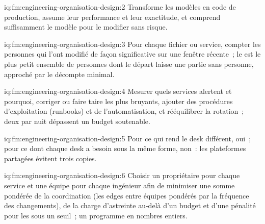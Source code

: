 \begin{solution}{iq:fm:engineering-organisation-design:2}
Transforme les modèles en code de production, assume leur performance et leur exactitude, et comprend suffisamment le modèle pour le modifier sans risque.
\end{solution}

\begin{solution}{iq:fm:engineering-organisation-design:3}
Pour chaque fichier ou service, compter les personnes qui l'ont modifié de façon significative sur une fenêtre récente~; le  est le plus petit ensemble de personnes dont
le départ laisse une partie sans personne, approché par le décompte minimal.
\end{solution}

\begin{solution}{iq:fm:engineering-organisation-design:4}
Mesurer quels services alertent et pourquoi, corriger ou faire taire les plus bruyants, ajouter des procédures d'exploitation (runbooks) et de l'automatisation, et rééquilibrer la rotation~; deux par nuit dépassent
un budget soutenable.
\end{solution}

\begin{solution}{iq:fm:engineering-organisation-design:5}
Pour ce qui rend le desk différent, oui~; pour ce dont chaque desk a besoin sous la même forme, non~: les plateformes partagées évitent trois copies.
\end{solution}

\begin{solution}{iq:fm:engineering-organisation-design:6}
Choisir un propriétaire pour chaque service et une équipe pour chaque ingénieur afin de minimiser une somme pondérée de la coordination (les edges entre équipes pondérés par la fréquence des
changements), de la charge d'astreinte au-delà d'un budget et d'une pénalité pour les  sous un seuil~; un programme en nombres entiers.
\end{solution}
